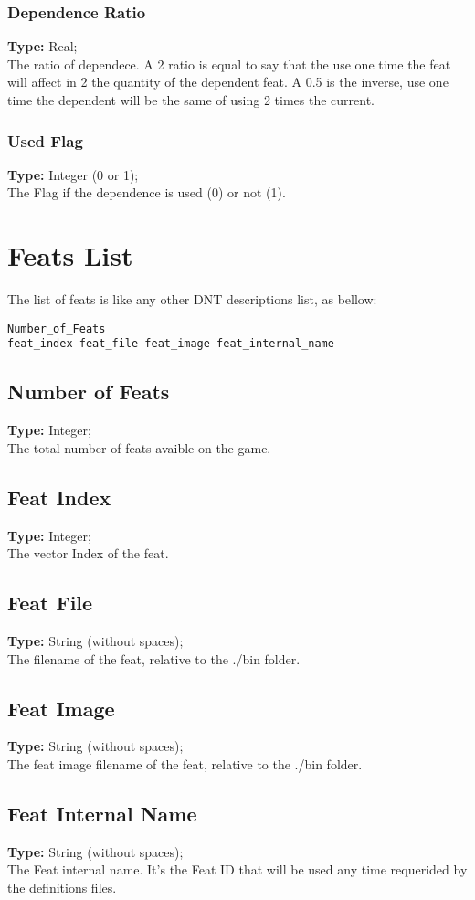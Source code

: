 \documentclass[letterpaper,12pt]{article}
\begin{document}
\subsubsection{Dependence Ratio}
{\bf Type:} Real;\\
The ratio of dependece. A 2 ratio is equal to say that the
use one time the feat will affect in 2 the quantity of the dependent feat. A
0.5 is the inverse, use one time the dependent will be the same of using 2
times the current.

\subsubsection{Used Flag}
{\bf Type:} Integer (0 or 1);\\
The Flag if the dependence is used (0) or not (1).

\section{Feats List}

The list of feats is like any other DNT descriptions list, as bellow:

\begin{verbatim}
Number_of_Feats
feat_index feat_file feat_image feat_internal_name
\end{verbatim}

\subsection{Number of Feats}
{\bf Type:} Integer;\\
The total number of feats avaible on the game.

\subsection{Feat Index}
{\bf Type:} Integer;\\
The vector Index of the feat.

\subsection{Feat File}
{\bf Type:} String (without spaces);\\
The filename of the feat, relative to the ./bin folder.

\subsection{Feat Image}
{\bf Type:} String (without spaces);\\
The feat image filename of the feat, relative to the ./bin folder.

\subsection{Feat Internal Name}
{\bf Type:} String (without spaces);\\
The Feat internal name. It's the Feat ID that will be used any time requerided
by the definitions files.
\end{document}
